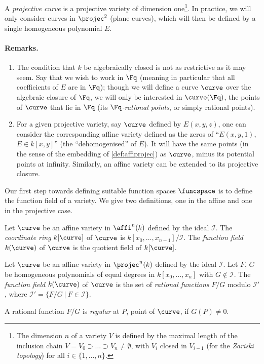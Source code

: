 A \emph{projective curve} is a projective variety of dimension one\footnote{The dimension $n$ of a variety $V$ is defined by
the maximal length of the inclusion chain $V = V_0 \supset \ldots \supset V_n \neq \emptyset$, with $V_i$ closed in $V_{i-1}$ (for the \emph{Zariski topology})
for all $i \in \{1,\ldots,n\}$.}. In practice, we will only consider curves in $\projec^2$ (plane curves),
which will then be defined by a single homogeneous polynomial $E$.

\paragraph{Remarks.}
\begin{enumerate}
\item The condition that $k$ be algebraically closed is not as restrictive as it may seem. Say that we wish to work in $\Fq$ (meaning in particular
that all coefficients of $E$ are in $\Fq$); though we will define a curve $\curve$ over the algebraic closure of $\Fq$, we
will only be interested in $\curve(\Fq)$, the points of $\curve$ that lie in $\Fq$ (its \emph{$\Fq$-rational points}, or simply rational points). 
\item For a given projective variety, say $\curve$ defined by $E(x,y,z)$, one can consider the corresponding affine variety defined as the zeros of ``$E(x,y,1)$,
$E \in k[x,y]$'' (the ``dehomogenised'' of $E$). It will have the same points (in the sense of the embedding of \autoref{def:affiprojec}) as $\curve$, minus its potential points at infinity.
Similarly, an affine variety can be extended to its projective closure.
\end{enumerate}

Our first step towards defining suitable function spaces $\funcspace$ is to define the function field of a variety.
We give two definitions, one in the affine and one in the projective case.

\begin{defi}
Let $\curve$ be an affine variety in $\affi^n(k)$ defined by the ideal $\mathcal{I}$. The \emph{coordinate ring} $k[\curve]$ of $\curve$ is $k[x_0, \ldots, x_{n-1}]/\mathcal{I}$.
The \emph{function field} $k(\curve)$ of $\curve$ is the quotient field of $k[\curve]$.
\end{defi}

\begin{defi}
Let $\curve$ be an affine variety in $\projec^n(k)$ defined by the ideal $\mathcal{I}$. Let $F$, $G$ be homogeneous polynomials of equal degrees in $k[x_0, \ldots, x_n]$
with $G \notin \mathcal{I}$. The \emph{function field} $k(\curve)$ of $\curve$ is the set of \emph{rational functions} $F/G$ modulo $\mathcal{I'}$,
where $\mathcal{I'} = \{F/G~|~ F \in \mathcal{I}\}$.

\noindent
A rational function $F/G$ is \emph{regular} at $P$, point of $\curve$, if $G(P) \neq 0$.
\end{defi}

